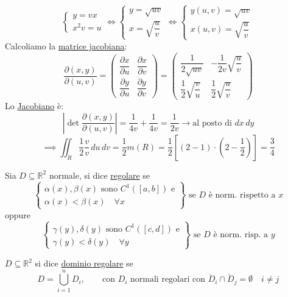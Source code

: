 \begin{esercizio}[EXE]
\[\begin{cases}
y = vx \\
x^2 v = u
\end{cases}
\iff
\begin{cases}
y = \sqrt{uv} \\[4pt]
x = \sqrt{\dfrac{u}{v}}
\end{cases}
\iff
\begin{cases}
y(u, v) = \sqrt{uv} \\[4pt]
x(u, v) = \sqrt{\dfrac{u}{v}}
\end{cases}
\]
Calcoliamo la \underline{matrice jacobiana}:
\[
\frac{\partial(x, y)}{\partial(u, v)} = \begin{pmatrix}
\dfrac{\partial x}{\partial u} & \dfrac{\partial x}{\partial v} \\[10pt]
\dfrac{\partial y}{\partial u} & \dfrac{\partial y}{\partial v}
\end{pmatrix} = \begin{pmatrix}
\dfrac{1}{2\sqrt{uv}} & -\dfrac{1}{2v}\sqrt{\dfrac{u}{v}} \\[10pt]
\dfrac{1}{2}\sqrt{\dfrac{v}{u}} & \dfrac{1}{2}\sqrt{\dfrac{u}{v}}
\end{pmatrix}
\]
Lo \underline{Jacobiano} è:
\[
\left| \det \frac{\partial(x, y)}{\partial(u, v)} \right| = \frac{1}{4v} + \frac{1}{4v} = \frac{1}{2v} \longrightarrow \text{al posto di } dx\, dy
\]
\[
\implies \iint_R \frac{1}{2} \frac{v}{v}\, du\, dv = \frac{1}{2} m(R) = \frac{1}{2} \left[ (2 - 1) \cdot \left(2 - \frac{1}{2}\right) \right] = \frac{3}{4}
\]
\end{esercizio}

\begin{definition}
Sia $D \subseteq \mathbb{R}^2$ normale, si dice \underline{regolare} se
\[
\left. \begin{cases}
\alpha(x), \beta(x) \text{ sono } C^1([a, b]) \text{ e} \\
\alpha(x) < \beta(x) \quad \forall x
\end{cases} \right\} \text{ se } D \text{ è norm. rispetto a } x
\]
oppure
\[
\left. \begin{cases}
\gamma(y), \delta(y) \text{ sono } C^1([c, d]) \text{ e} \\
\gamma(y) < \delta(y) \quad \forall y
\end{cases} \right\} \text{ se } D \text{ è norm. risp. a } y
\]
\end{definition}

\begin{definition}
$D \subseteq \mathbb{R}^2$ si dice \underline{dominio regolare} se
\[
D = \bigcup_{i=1}^n D_i, \qquad \text{con } D_i \text{ normali regolari con } \mathring{D}_i \cap \mathring{D}_j = \emptyset \quad i \neq j
\]
\end{definition}


